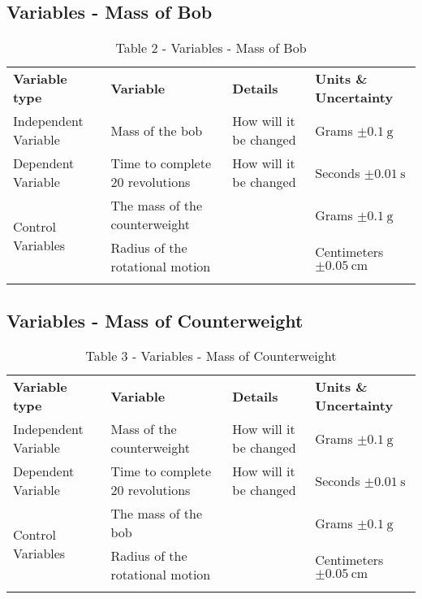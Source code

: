 \documentclass{lab}
\begin{document}
	\noindent\begin{minipage}{\textwidth}
    \subsection{Variables - Mass of Bob}
    \vspace{-0.2cm}
	\renewcommand{\arraystretch}{1.1}
        \begin{table}[H]
            \begin{tabular}{l|ll|l}
				\dtoprule
				\textbf{Variable type}					& \textbf{Variable}								& \textbf{Details}		 & \textbf{Units \& Uncertainty}	\\
				Independent Variable					& Mass of the bob								& How will it be changed & Grams $\pm \SI{0.1}{\gram}$		\\
				Dependent Variable						& Time to complete 20 revolutions				& How will it be changed & Seconds $\pm \SI{0.01}{\second}$	\\
				\multirow{2}{*}{Control Variables}		& The mass of the counterweight					&						 & Grams $\pm \SI{0.1}{\gram}$		\\
														& Radius of the rotational motion				&						 & Centimeters $\pm \SI{0.05}{\cm}$	\\
				\dbottomrule
	    \end{tabular}
	    \caption{Table 2 - Variables - Mass of Bob}
	    \label{table: variables2}
	\end{table}
	\end{minipage}

	\noindent\begin{minipage}{\textwidth}
    \subsection{Variables - Mass of Counterweight}
    \vspace{-0.2cm}
	\renewcommand{\arraystretch}{1.1}
        \begin{table}[H]
            \begin{tabular}{l|ll|l}
				\dtoprule
				\textbf{Variable type}					& \textbf{Variable}						& \textbf{Details}		 & \textbf{Units \& Uncertainty}	\\
				Independent Variable					& Mass of the counterweight				& How will it be changed & Grams $\pm \SI{0.1}{\gram}$		\\
				Dependent Variable						& Time to complete 20 revolutions		& How will it be changed & Seconds $\pm \SI{0.01}{\second}$	\\
				\multirow{2}{*}{Control Variables}		& The mass of the bob					&						 & Grams $\pm \SI{0.1}{\gram}$		\\
														& Radius of the rotational motion		&						 & Centimeters $\pm \SI{0.05}{\cm}$	\\
				\dbottomrule
	    \end{tabular}
	    \caption{Table 3 - Variables - Mass of Counterweight}
	    \label{table: variables3}
	\end{table}
	\end{minipage}
\end{document}
